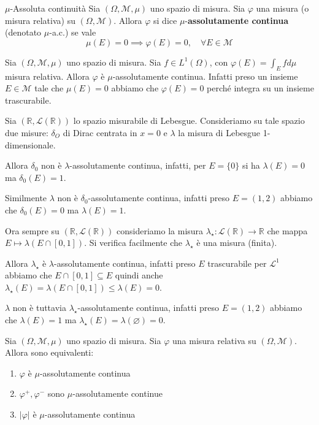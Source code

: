 \begin{definition}{\(\mu\)-Assoluta continuità}
    Sia \((\Omega, \mathcal{M}, \mu)\) uno spazio di misura. Sia \(\varphi\) una
    misura (o misura relativa) su \((\Omega, \mathcal{M})\). Allora \(\varphi\)
    si dice \(\mu\)-\textbf{assolutamente continua} (denotato \(\mu\)-a.c.) se
    vale 
    \[
        \mu(E) = 0 \implies \varphi(E) = 0, \quad \forall E \in \mathcal{M}
    \]
\end{definition}
\begin{example}
    Sia \((\Omega, \mathcal{M}, \mu)\) uno spazio di misura. Sia \(f \in
    L^{1}(\Omega)\), con \(\varphi(E) = \int_E f d\mu\) misura relativa. Allora
    \(\varphi\) è \(\mu\)-assolutamente continua. Infatti preso un insieme \(E \in
    \mathcal{M}\) tale che \(\mu(E) = 0\) abbiamo che \(\varphi(E) = 0\) perché
    integra su un insieme trascurabile.
\end{example}
\begin{example}
    Sia \((\mathbb{R}, \mathcal{L}(\mathbb{R}))\) lo spazio misurabile di
    Lebesgue. Consideriamo su tale spazio due misure: \(\delta_O\)
    di Dirac centrata in \(x=0\) e \(\lambda\) la misura di Lebesgue
    1-dimensionale. 

    Allora \(\delta_0\) non è \(\lambda\)-assolutamente continua, infatti, per \(E =\{0\} \)
    si ha \(\lambda(E) = 0\) ma \(\delta_0(E) = 1\). 

    Similmente \(\lambda\) non è \(\delta_0\)-assolutamente continua, infatti preso
    \(E = (1, 2)\) abbiamo che \(\delta_0(E) = 0\) ma \(\lambda(E) = 1\).
\end{example}
\begin{example}
    Ora sempre su \((\mathbb{R}, \mathcal{L}(\mathbb{R}))\) consideriamo la
    misura \(\lambda_{\star} : \mathcal{L}(\mathbb{R}) \to
    \mathbb{R}\) che mappa \(E \mapsto \lambda(E \cap [0, 1])\). Si verifica facilmente che \(\lambda_\star\) è una misura (finita).

    Allora \(\lambda_\star\) è \(\lambda\)-assolutamente continua, infatti preso \(E\) trascurabile per \(\mathcal{L}^{1}\) abbiamo
    che \(E \cap [0, 1] \subseteq E \) quindi anche \(\lambda_{\star}(E)
    = \lambda(E \cap [0,1]) \le \lambda(E) = 0\).

    \(\lambda\) non è tuttavia \(\lambda_\star\)-assolutamente
    continua, infatti preso \(E = (1, 2)\) abbiamo che \(\lambda(E) =
    1\) ma \(\lambda_\star(E) = \lambda(\varnothing)= 0\).
\end{example}
\begin{proposition}\label{prop:equivalenti_ac}
    Sia \((\Omega, \mathcal{M}, \mu)\) uno spazio di misura. Sia \(\varphi\) una
    misura relativa su \((\Omega, \mathcal{M})\). Allora sono equivalenti:
\begin{enumerate}[label = \roman*)]
    \item \(\varphi\) è \(\mu\)-assolutamente continua
    \item \(\varphi^{+}, \varphi^{-}\) sono \(\mu\)-assolutamente continue
    \item \(|\varphi|\) è \(\mu\)-assolutamente continua
\end{enumerate}
\end{proposition}
